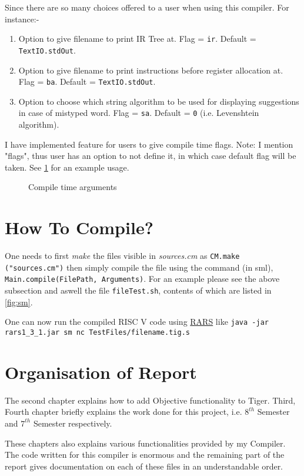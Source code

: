 Since there are so many choices offered to a user when using this compiler. For instance:-

\begin{enumerate}
	\item Option to give filename to print IR Tree at. Flag = \texttt{ir}. Default = \texttt{TextIO.stdOut}.
	\item Option to give filename to print instructions before register allocation at. Flag = \texttt{ba}. Default = \texttt{TextIO.stdOut}.
	\item Option to choose which string algorithm to be used for displaying suggestions in case of mistyped word. Flag = \texttt{sa}. Default = \texttt{0} (i.e. Levenshtein algorithm).
\end{enumerate}

I have implemented feature for users to give compile time flags. Note: I mention "flags", thus user has an option to not define it, in which case default flag will be taken. See \ref{fig:flags} for an example usage.


\begin{figure}
	\centering
	\caption{Compile time arguments}
	\label{fig:flags}
\end{figure}

\section{How To Compile?}

One needs to first \textit{make} the files visible in \textit{sources.cm} as \texttt{CM.make ("sources.cm")} then simply compile the file using the command (in sml), \texttt{Main.compile(FilePath, Arguments)}. For an example please see the above subsection and aswell the file \texttt{fileTest.sh}, contents of which are listed in \ref{fig:sm}.

One can now run the compiled RISC V code using \href{https://github.com/TheThirdOne/rars}{RARS} like \texttt{java -jar rars1\_3\_1.jar sm nc TestFiles/filename.tig.s}

\section{Organisation of Report}

The second chapter explains how to add Objective functionality to Tiger. Third, Fourth chapter briefly explains the work done for this project, i.e. $8^{th}$ Semester and $7^{th}$ Semester respectively.

These chapters also explains various functionalities provided by my Compiler. The code written for this compiler is enormous and the remaining part of the report gives documentation on each of these files in an understandable order.